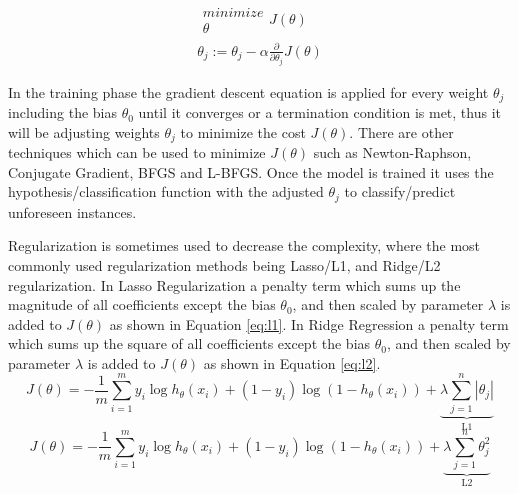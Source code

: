 \begin{equation} \label{eq:loggradient}
    \begin{aligned}
        \substack{minimize \\ \theta } {J}(\theta)\\[0.1cm]
        \theta_j := \theta_j - \alpha \frac{\partial}{\partial \theta_j} {J}(\theta)
    \end{aligned}
\end{equation}

\noindent In the training phase the gradient descent equation is applied for every weight \(\theta_j\) including the bias \(\theta_0\) until it converges or a termination condition is met, thus it will be adjusting weights \(\theta_j\) to minimize the cost \(J(\theta)\). There are other techniques which can be used to minimize \(J(\theta)\) such as Newton-Raphson, Conjugate Gradient, BFGS and L-BFGS. Once the model is trained it uses the hypothesis/classification function with the adjusted \(\theta_j\) to classify/predict unforeseen instances. 

\noindent Regularization is sometimes used to decrease the complexity, where the most commonly used regularization methods being Lasso/L1, and Ridge/L2 regularization. In Lasso Regularization a penalty term which sums up the magnitude of all coefficients except the bias \(\theta_0\), and then scaled by parameter \(\lambda\) is added to \(J(\theta)\) as shown in Equation \eqref{eq:l1}. In Ridge Regression a penalty term which sums up the square of all coefficients except the bias  \(\theta_0\), and then scaled by parameter  \(\lambda\) is added to \(J(\theta)\) as shown in Equation \eqref{eq:l2}.
\begin{equation} \label{eq:l1}
          {J(\theta)} = - \frac{1}{m} \sum\limits_{i=1}^{m} {y_i \log h_\theta(x_i) + (1 - y_i) \log(1 - h_\theta(x_i)) + \underbrace{\lambda \sum\limits_{j=1}^{n} |\theta_j|}_\text{L1}} 
\end{equation}
\begin{equation} \label{eq:l2}
          {J(\theta)} = - \frac{1}{m} \sum\limits_{i=1}^{m} {y_i \log h_\theta(x_i) + (1 - y_i) \log(1 - h_\theta(x_i)) + \underbrace{\lambda \sum\limits_{j=1}^{n} \theta_j ^2}_\text{L2}} 
\end{equation}